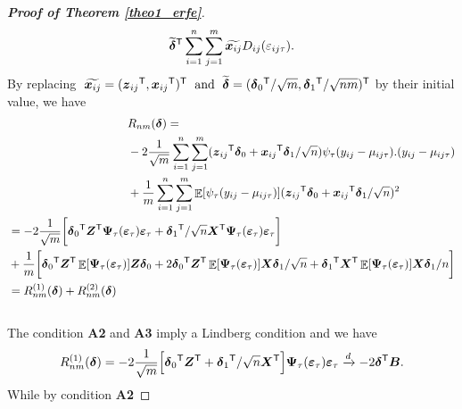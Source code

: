 \documentclass[15pt,a4paper]{article}
\DeclareMathOperator{\E}{\mathbb{E}}
\newcommand{\transpose}{{}^{\text{\sffamily T}}}
\begin{document}
\begin{proof}[\textbf{Proof of Theorem \ref{theo1_erfe}}]
\begin{equation}
\begin{split}
    \widetilde{\boldsymbol{\delta}}\transpose\sum_{i=1}^{n}\sum_{j=1}^{m}
    \widetilde{\boldsymbol{x}_{ij}}D_{ij}(\varepsilon_{ij\tau}). \\
\end{split}
\end{equation}
By replacing $\; \widetilde{\boldsymbol{x}_{ij}}=(\boldsymbol{z}_{ij}\transpose,\boldsymbol{x}_{ij}\transpose)\transpose \; \mbox{ and } \; \widetilde{\boldsymbol{\delta}}=(\boldsymbol{\delta}_0\transpose/\sqrt{m},
\boldsymbol{\delta}_1\transpose/\sqrt{nm})\transpose$ by their initial value, we have
\begin{align*}
\begin{split}
   {}& R_{nm}(\boldsymbol{\delta}) = \\
    & -2\frac{1}{\sqrt{m}}\sum_{i=1}^{n}\sum_{j=1}^{m}(\boldsymbol{z}_{ij}\transpose\boldsymbol{\delta}_0 + \boldsymbol{x}_{ij}\transpose\boldsymbol{\delta}_1/\sqrt{n})
     \psi_\tau(y_{ij}-\mu_{ij\tau}).(y_{ij}-\mu_{ij\tau})\\ 
    & +\frac{1}{m}\sum_{i=1}^{n}\sum_{j=1}^{m}\E[\psi_\tau(y_{ij}-\mu_{ij\tau})](\boldsymbol{z}_{ij}\transpose\boldsymbol{\delta}_0+\boldsymbol{x}_{ij} \transpose\boldsymbol{\delta}_1/\sqrt{n})^2
\end{split}\\
\begin{split}
    {}&= -2\frac{1}{\sqrt{m}}\bigg[\boldsymbol{\delta}_0\transpose\boldsymbol{Z}\transpose\boldsymbol{\Psi}_\tau(\boldsymbol{\varepsilon}_{\tau})\boldsymbol{\varepsilon}_{\tau} +\boldsymbol{\delta}_1\transpose/\sqrt{n}\boldsymbol{X}\transpose\boldsymbol{\Psi}_\tau(\boldsymbol{\varepsilon}_{\tau})\boldsymbol{\varepsilon}_{\tau}\bigg]\\
    & + \frac{1}{m}\bigg[ \boldsymbol{\delta}_0\transpose\boldsymbol{Z}\transpose\E[\boldsymbol{\Psi}_\tau(\boldsymbol{\varepsilon}_{\tau})]\boldsymbol{Z}
    \boldsymbol{\delta}_0 + 2\boldsymbol{\delta}_0\transpose\boldsymbol{Z}\transpose\E[\boldsymbol{\Psi}_\tau(\boldsymbol{\varepsilon}_{\tau})]
    \boldsymbol{X}\boldsymbol{\delta}_1/\sqrt{n} +\boldsymbol{\delta}_1\transpose\boldsymbol{X}\transpose\E[\boldsymbol{\Psi}_\tau(\boldsymbol{\varepsilon}_{\tau})]\boldsymbol{X}
    \boldsymbol{\delta}_1/n\bigg]\\
    & = R_{nm}^{(1)}(\boldsymbol{\delta}) + R_{nm}^{(2)}(\boldsymbol{\delta})
\end{split}\\
\end{align*}
~~\\
The condition \textbf{A2} and \textbf{A3} imply a Lindberg condition and we have
\begin{equation*}
    R_{nm}^{(1)}(\boldsymbol{\delta})=-2\frac{1}{\sqrt{m}}\Big[\boldsymbol{\delta}_0\transpose\boldsymbol{Z}
    \transpose+\boldsymbol{\delta}_1\transpose/\sqrt{n}\boldsymbol{X}\transpose\Big]\boldsymbol{\Psi}_\tau(\boldsymbol{\varepsilon}_{\tau})\boldsymbol{\varepsilon}_{\tau}
    \xrightarrow{d}-2\boldsymbol{\delta}\transpose\boldsymbol{B}.
\end{equation*}
While by condition \textbf{A2}



\end{proof}
\end{document}
